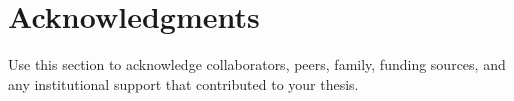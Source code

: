 \chapter*{Acknowledgments}

Use this section to acknowledge collaborators, peers, family, funding sources, and any institutional support that contributed to your thesis.
